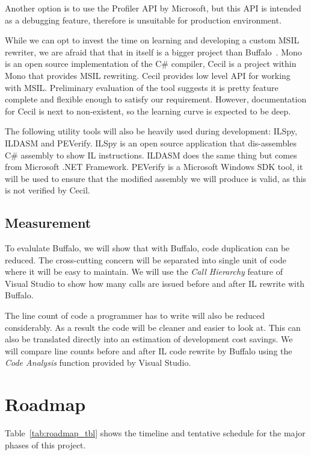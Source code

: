 Another option is to use the Profiler API by Microsoft, but this API is intended as a debugging feature, therefore is unsuitable for production environment.

While we can opt to invest the time on learning and developing a custom MSIL rewriter, we are afraid that that in itself is a bigger project than Buffalo~\cite{msil_text}. Mono is an open source implementation of the C\# compiler, Cecil is a project within Mono that provides MSIL rewriting. Cecil provides low level API for working with MSIL. Preliminary evaluation of the tool suggests it is pretty feature complete and flexible enough to satisfy our requirement. However, documentation for Cecil is next to non-existent, so the learning curve is expected to be deep.

The following utility tools will also be heavily used during development: ILSpy, ILDASM and PEVerify. ILSpy is an open source application that dis-assembles C\# assembly to show IL instructions. ILDASM does the same thing but comes from Microsoft .NET Framework. PEVerify is a Microsoft Windows SDK tool, it will be used to ensure that the modified assembly we will produce is valid, as this is not verified by Cecil.

\subsection{Measurement}
To evalulate Buffalo, we will show that with Buffalo, code duplication can be reduced. The cross-cutting concern will be separated into single unit of code where it will be easy to maintain. We will use the {\em Call Hierarchy} feature of Visual Studio to show how many calls are issued before and after IL rewrite with Buffalo. 

The line count of code a programmer has to write will also be reduced considerably. As a result the code will be cleaner and easier to look at. This can also be translated directly into an estimation of development cost savings. We will compare line counts before and after IL code rewrite by Buffalo using the {\em Code Analysis} function provided by Visual Studio.

\section{Roadmap}
Table~\ref{tab:roadmap_tbl} shows the timeline and tentative schedule for the major phases of this project.

